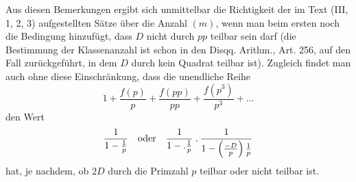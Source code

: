 Aus diesen Bemerkungen ergibt sich unmittelbar die Richtigkeit der im Text (III, 1, 2, 3) aufgestellten Sätze über die Anzahl $(m)$, wenn man beim ersten noch die Bedingung hinzufügt, dass $D$ nicht durch $pp$ teilbar sein darf (die Bestimmung der Klassenanzahl ist schon in den Disqq. Arithm., Art. 256, auf den Fall zurückgeführt, in dem $D$ durch kein Quadrat teilbar ist). Zugleich findet man auch ohne diese Einschränkung, dass die unendliche Reihe
\[
1+\frac{f(p)}p+\frac{f(pp)}{pp}+\frac{f(p^3)}{p^3}+\ldots
\]
den Wert
\[
\frac1{1-\frac1p}\quad\text{oder}\quad\frac1{1-.\frac1p}\mathbin{.}\frac1{1-\left(\frac{-D}p\right)\frac1p}
\]
hat, je nachdem, ob $2D$ durch die Primzahl $p$ teilbar oder nicht teilbar ist.
